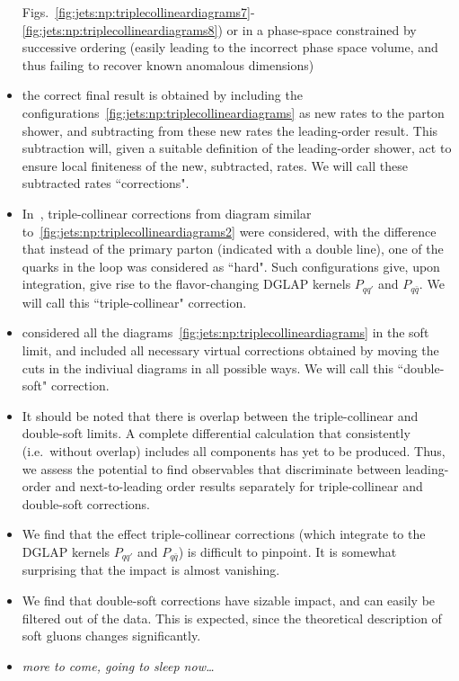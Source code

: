 \begin{itemize}
Figs.~\ref{fig:jets:np:triplecollineardiagrams7}-\ref{fig:jets:np:triplecollineardiagrams8})
or in a phase-space constrained by successive ordering (easily leading to the 
incorrect phase space volume, and thus failing to recover known anomalous
dimensions)
\item the correct final result is obtained by including the 
configurations~\ref{fig:jets:np:triplecollineardiagrams}
as new rates to the parton shower, and subtracting from these new rates
the leading-order result. This subtraction will, given a suitable definition
of the leading-order shower, act to ensure local finiteness of the new, 
subtracted, rates. We will call these subtracted rates ``corrections".
\item In~\cite{Hoche:2017iem}, triple-collinear corrections from diagram
similar to~\ref{fig:jets:np:triplecollineardiagrams2} were considered, with
the difference that instead of the primary parton (indicated with a double 
line), one of the quarks in the loop was considered as ``hard". Such
configurations give, upon integration, give rise to the flavor-changing 
DGLAP kernels $P_{qq'}$ and $P_{q\bar q}$. We
will call this ``triple-collinear" correction.
\item \cite{Dulat:2018vuy} considered all the 
diagrams~\ref{fig:jets:np:triplecollineardiagrams}
in the soft limit, and included all necessary virtual corrections obtained
by moving the cuts in the indiviual diagrams in all possible ways. We
will call this ``double-soft" correction.
\item It should be noted that there is overlap between the
triple-collinear and double-soft limits. A complete differential calculation 
that consistently (i.e.\ without overlap) includes all components has yet
to be produced. Thus, we assess the potential to find observables
that discriminate between leading-order and next-to-leading order
results separately for triple-collinear and double-soft corrections.
\item We find that the effect triple-collinear corrections (which integrate to
the DGLAP kernels $P_{qq'}$ and $P_{q\bar q}$) is difficult to pinpoint. 
It is somewhat surprising that the impact is almost vanishing.
\item We find that double-soft corrections have sizable impact, and can
easily be filtered out of the data. This is expected, since the theoretical
description of soft gluons changes significantly.
\item \emph{more to come, going to sleep now\dots}
\end{itemize}

